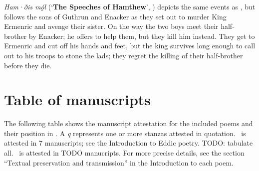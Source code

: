 \emph{Ham·ðis mǫ́l} (‘\textbf{The Speeches of Hamthew}’, ) depicts the same events as , but follows the sons of Guthrun and Enacker as they set out to murder King Ermenric and avenge their sister.  On the way the two boys meet their half-brother by Enacker; he offers to help them, but they kill him instead.  They get to Ermenric and cut off his hands and feet, but the king survives long enough to call out to his troops to stone the lads; they regret the killing of their half-brother before they die.

\section{Table of manuscripts}

The following table shows the manuscript attestation for the included poems and their position in \Regius.  A \emph{q} represents one or more stanzas attested in quotation.
\Skaldskaparmal\ is attested in 7 manuscripts; see the Introduction to Eddic poetry.  TODO: tabulate all.
\Nornagest\ is attested in TODO manucripts.
For more precise details, see the section “Textual preservation and transmission” in the Introduction to each poem.

